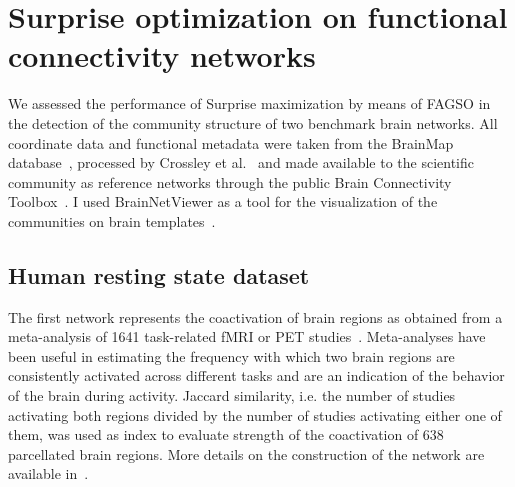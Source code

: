 \section{Surprise optimization on functional connectivity networks}
\label{sec:surprise_optimization_fc_networks}
We assessed the performance of Surprise maximization by means of FAGSO in the detection of the community structure of two benchmark brain networks. All coordinate data and functional metadata were taken from the BrainMap database~\cite{fox2002,laird2005}, processed by Crossley et al.~\cite{crossley2013a} and made available to the scientific community as reference networks through the public Brain Connectivity Toolbox~\cite{rubinov2010}. I used BrainNetViewer as a tool for the visualization of the communities on brain templates~\cite{xia2013}.

\subsection{Human resting state dataset}\label{sec:restingstatedataset}
The first network represents the coactivation of brain regions as obtained from a meta-analysis of 1641 task-related fMRI or PET studies~\cite{crossley2013a}.
Meta-analyses have been useful in estimating the frequency with which two brain regions are consistently activated across different tasks and are an indication of the behavior of the brain during activity.
Jaccard similarity, i.e. the number of studies activating both regions divided by the number of studies activating either one of them, was used as index to evaluate strength of the coactivation of 638 parcellated brain regions. More details on the construction of the network are available in~\cite{crossley2013a}.

